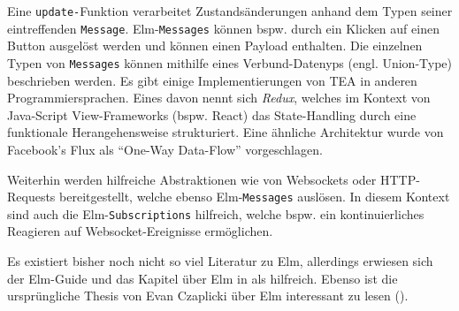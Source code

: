 Eine \texttt{update-}Funktion verarbeitet Zustandsänderungen anhand dem Typen seiner eintreffenden \texttt{Message}.
Elm-\texttt{Messages} können \ac{bspw.} durch ein Klicken auf einen Button ausgelöst werden und können einen Payload enthalten.
Die einzelnen Typen von \texttt{Messages} können mithilfe eines Verbund-Datenyps (engl. Union-Type) beschrieben werden.
Es gibt einige Implementierungen von TEA in anderen Programmiersprachen.
Eines davon nennt sich \textit{Redux}, welches im Kontext von Java-Script View-Frameworks (\ac{bspw.} React) das State-Handling durch eine funktionale Herangehensweise strukturiert.
Eine ähnliche Architektur wurde von Facebook's Flux als "`One-Way Data-Flow"' vorgeschlagen.
\par
Weiterhin werden hilfreiche Abstraktionen wie von Websockets oder HTTP-Requests bereitgestellt, welche ebenso Elm-\texttt{Messages} auslösen.
In diesem Kontext sind auch die Elm-\texttt{Subscriptions} hilfreich, welche \ac{bspw.} ein kontinuierliches Reagieren auf Websocket-Ereignisse ermöglichen.
\par 
Es existiert bisher noch nicht so viel Literatur zu Elm, allerdings erwiesen sich der Elm-Guide und das Kapitel über Elm in \cite{tate2014seven} als hilfreich.
Ebenso ist die ursprüngliche Thesis von Evan Czaplicki über Elm interessant zu lesen (\cite{elm-thesis}).
